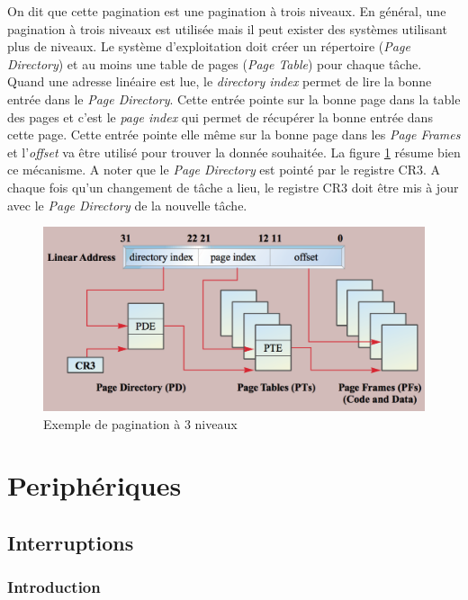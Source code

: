 \documentclass[a4paper, 12pt]{article}
\begin{document}
On dit que cette pagination est une pagination à trois niveaux. En général, une
pagination à trois niveaux est utilisée mais il peut exister des systèmes utilisant
plus de niveaux. Le système d'exploitation doit créer un répertoire (\textit{Page Directory})
et au moins une table de pages (\textit{Page Table}) pour chaque tâche. Quand une
adresse linéaire est lue, le \textit{directory index} permet de lire la bonne
entrée dans le \textit{Page Directory}. Cette entrée pointe sur la bonne page
dans la table des pages et c'est le \textit{page index} qui permet de récupérer
la bonne entrée dans cette page. Cette entrée pointe elle même sur la bonne page
dans les \textit{Page Frames} et l'\textit{offset} va être utilisé pour trouver
la donnée souhaitée. La figure \ref{paging3} résume bien ce mécanisme. A noter que le
\textit{Page Directory} est pointé par le registre CR3. A chaque fois qu'un changement
de tâche a lieu, le registre CR3 doit être mis à jour avec le \textit{Page Directory}
de la nouvelle tâche.\cite{ref15}

\begin{figure}[!h]
  \centering
  \includegraphics[scale=0.75]{images/paging3.png}
  \caption{Exemple de pagination à 3 niveaux}
  \label{paging3}
\end{figure}

\newpage

\section{Periphériques}
\subsection{Interruptions}
\subsubsection{Introduction}
\end{document}
